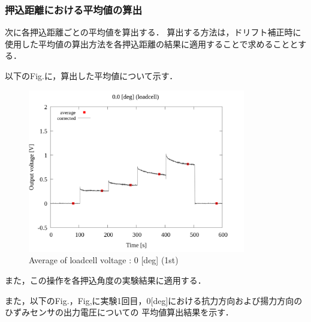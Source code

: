 \subsubsection{押込距離における平均値の算出}

次に各押込距離ごとの平均値を算出する．
算出する方法は，ドリフト補正時に使用した平均値の算出方法を各押込距離の結果に適用することで求めることとする．

以下のFig.に，算出した平均値について示す．

\begin{figure}[htbp]
    \footnotesize
    \begin{center}
        \includegraphics[width=95mm]{../../02_workspace/result/2-1/plot/03-1_loadcell/03_loadcell_average_0.png}
        \caption{Average of loadcell voltage : 0 [deg] (1st)}
    \end{center}
\end{figure}

また，この操作を各押込角度の実験結果に適用する．

\newpage

また，以下のFig.，Fig,に実験1回目，0[deg]における抗力方向および揚力方向のひずみセンサの出力電圧についての
平均値算出結果を示す．

